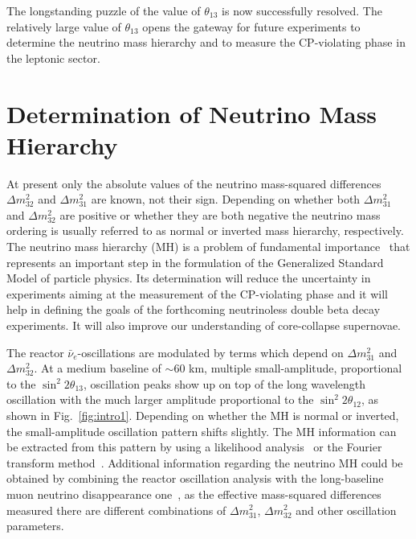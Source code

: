 \documentclass[aps,twocolumn,preprintnumbers,amsmath,superscriptaddress,amssymb,floats,nofootinbib]{revtex4-1}
\begin{document}
The longstanding puzzle of the value of $\theta_{13}$ is now successfully resolved.
The relatively large value of $\theta_{13}$ opens the gateway for future experiments to determine the neutrino mass hierarchy and 
to measure the CP-violating phase in the leptonic sector.


\section{Determination of Neutrino Mass Hierarchy}

At present only the absolute values of the neutrino mass-squared differences $\Delta m^2_{32}$ and $\Delta m^2_{31}$ are known, not their sign.
Depending on whether both $\Delta m^2_{31}$ and $\Delta m^2_{32}$ are positive or whether they are both negative the neutrino mass ordering is usually referred to as normal or inverted mass hierarchy, respectively.
The neutrino mass hierarchy (MH) is a problem of fundamental importance~\cite{MHwhitepaper} that represents an important step in the formulation of the Generalized Standard Model of particle physics.
Its determination will reduce the uncertainty in experiments aiming at the measurement of the CP-violating phase 
and it will help in defining the goals of the forthcoming neutrinoless double beta decay experiments.
It will also improve our understanding of core-collapse supernovae.

The reactor $\bar\nu_e$-oscillations are modulated by terms which depend on $\Delta m^2_{31}$ and $\Delta m^2_{32}$.
At a medium baseline of $\sim$60 km, multiple small-amplitude, proportional to the $\sin^2 2 \theta_{13}$, oscillation peaks show up 
on top of the long wavelength oscillation with the much larger amplitude proportional to the $\sin^2 2 \theta_{12}$, as shown in Fig.~\ref{fig:intro1}.
Depending on whether the MH is normal or inverted, the small-amplitude oscillation pattern shifts slightly.
The MH information can be extracted from this pattern by using a likelihood analysis~\cite{Li-PRD13} or the Fourier transform method~\cite{Zhan-PRD08,Zhan-PRD09}.
Additional information regarding the neutrino MH could be obtained by combining the reactor oscillation analysis with the long-baseline muon neutrino disappearance one~\cite{Minakata}, 
as the effective mass-squared differences measured there are different combinations of $\Delta m^2_{31}$, $\Delta m^2_{32}$ and other oscillation parameters.
\end{document}

